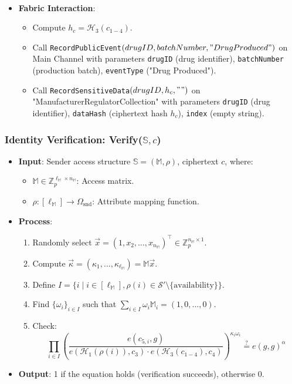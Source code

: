 \documentclass[runningheads]{llncs}
\begin{document}
\begin{itemize}
\[\begin{aligned}
        \end{aligned}
    \]
    \item \textbf{Fabric Interaction}:
    \begin{itemize}
        \item Compute $h_c = \mathcal{H}_3(c_{1-4})$.
        \item Call \texttt{RecordPublicEvent$(drugID, \\ batchNumber, "Drug Produced")$} on Main Channel with parameters \texttt{drugID} (drug identifier), \texttt{batchNumber} (production batch), \texttt{eventType} ("Drug Produced").
        \item Call \texttt{RecordSensitiveData$(drugID, h_c, "")$} on "ManufacturerRegulatorCollection" with parameters \texttt{drugID} (drug identifier), \texttt{dataHash} (ciphertext hash $h_c$), \texttt{index} (empty string).
    \end{itemize}
\end{itemize}

\subsubsection{Identity Verification: Verify($\mathbb{S}, c$)}
\begin{itemize}
    \item \textbf{Input}: Sender access structure $\mathbb{S} = (\mathbb{M}, \rho)$, ciphertext $c$, where:
    \begin{itemize}
        \item $\mathbb{M} \in \mathbb{Z}_p^{\ell_{\mathbb{M}} \times n_{\mathbb{M}}}$: Access matrix.
        \item $\rho: [\ell_{\mathbb{M}}] \to \Omega_{\mathrm{snd}}$: Attribute mapping function.
    \end{itemize}
    \item \textbf{Process}:
    \begin{enumerate}
        \item Randomly select $\vec{x} = (1, x_2, \ldots, x_{n_{\mathbb{M}}})^\top \in \mathbb{Z}_p^{n_{\mathbb{M}} \times 1}$.
        \item Compute $\vec{\kappa} = (\kappa_1, \ldots, \kappa_{\ell_{\mathbb{M}}}) = \mathbb{M} \vec{x}$.
        \item Define $I = \{ i \mid i \in [\ell_{\mathbb{M}}], \rho(i) \in \mathcal{S}' \setminus \{\text{availability}\} \}$.
        \item Find $\{\omega_i\}_{i \in I}$ such that $\sum_{i \in I} \omega_i \mathbb{M}_i = (1, 0, \ldots, 0)$.
        \item Check:
        \[
        \prod_{i \in I} \left( \frac{e(c_{5,i}, g)}{e(\mathcal{H}_1(\rho(i)), c_3) \cdot e(\mathcal{H}_3(c_{1-4}), c_4)} \right)^{\kappa_i \omega_i} \stackrel{?}{=} e(g,g)^\alpha
        \]
    \end{enumerate}
    \item \textbf{Output}: 1 if the equation holds (verification succeeds), otherwise 0.
\end{itemize}
\end{document}
